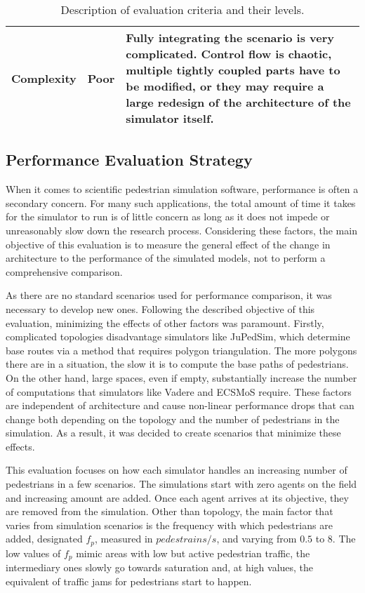 \documentclass[twoside, 11pt]{article}
\begin{document}
\begin{center}
\begin{table}
\begin{tabularx}{\textwidth}{ | p{2.9cm} | l | X | }
      \\ 
      \hline
      Complexity & Poor & 
      Fully integrating the scenario is very complicated. Control flow is chaotic, multiple tightly coupled parts have to be modified, or they may require a large redesign of the architecture of the simulator itself.
      \\ 
      \hline
    \end{tabularx}
    \caption{Description of evaluation criteria and their levels.}
    \label{table:qualitative-evaluation-criteria}
  \end{table}
\end{center}




\subsection{Performance Evaluation Strategy} \label{sec:performace-evaluation}

When it comes to scientific pedestrian simulation software, performance is often a secondary concern. For many such applications, the total amount of time it takes for the simulator to run is of little concern as long as it does not impede or unreasonably slow down the research process. Considering these factors, the main objective of this evaluation is to measure the general effect of the change in architecture to the performance of the simulated models, not to perform a comprehensive comparison. 

As there are no standard scenarios used for performance comparison, it was necessary to develop new ones. Following the described objective of this evaluation, minimizing the effects of other factors was paramount. Firstly, complicated topologies disadvantage simulators like JuPedSim, which determine base routes via a method that requires polygon triangulation. The more polygons there are in a situation, the slow it is to compute the base paths of pedestrians. On the other hand, large spaces, even if empty, substantially increase the number of computations that simulators like Vadere and ECSMoS require. These factors are independent of architecture and cause non-linear performance drops that can change both depending on the topology and the number of pedestrians in the simulation. As a result, it was decided to create scenarios that minimize these effects.

This evaluation focuses on how each simulator handles an increasing number of pedestrians in a few scenarios. The simulations start with zero agents on the field and increasing amount are added. Once each agent arrives at its objective, they are removed from the simulation. Other than topology, the main factor that varies from simulation scenarios is the frequency with which pedestrians are added, designated $f_p$, measured in $pedestrains/s$, and varying from $0.5$ to $8$. The low values of $f_p$ mimic areas with low but active pedestrian traffic, the intermediary ones slowly go towards saturation and, at high values, the equivalent of traffic jams for pedestrians start to happen.
\end{document}
